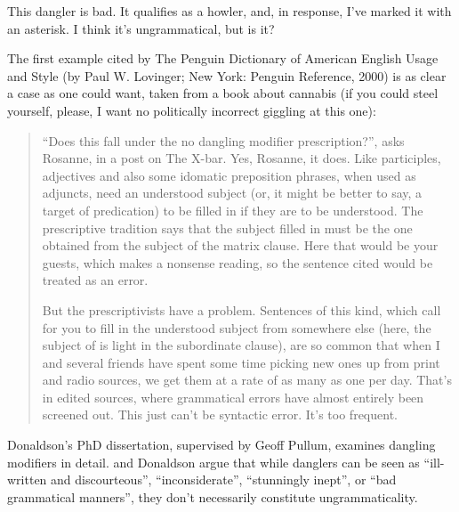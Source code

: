 This dangler is bad. It qualifies as a howler, and, in response, I've marked it with an asterisk. I think it's ungrammatical, but is it?

The first example cited by The Penguin Dictionary of American English Usage and Style (by Paul W. Lovinger; New York: Penguin Reference, 2000) is as clear a case as one could want, taken from a book about cannabis (if you could steel yourself, please, I want no politically incorrect giggling at this one):

\ea
 \z
\z

\begin{quote}
\enquote{Does this fall under the no dangling modifier prescription?}, asks Rosanne, in a post on The X-bar. Yes, Rosanne, it does. Like participles, adjectives and also some idomatic preposition phrases, when used as adjuncts, need an understood subject (or, it might be better to say, a target of predication) to be filled in if they are to be understood. The prescriptive tradition says that the subject filled in must be the one obtained from the subject of the matrix clause. Here that would be your guests, which makes a nonsense reading, so the sentence cited would be treated as an error.

But the prescriptivists have a problem. Sentences of this kind, which call for you to fill in the understood subject from somewhere else (here, the subject of is light in the subordinate clause), are so common that when I and several friends have spent some time picking new ones up from print and radio sources, we get them at a rate of as many as one per day. That's in edited sources, where grammatical errors have almost entirely been screened out. This just can't be syntactic error. It's too frequent.\hfill\citep{LanguageLog218}
\end{quote}

Donaldson's PhD dissertation, supervised by Geoff Pullum, examines dangling modifiers in detail. \citet{LanguageLog218,LanguageLog1938,LanguageLog1973,LanguageLog2153} and Donaldson argue that while danglers can be seen as \enquote{ill-written and discourteous}, \enquote{inconsiderate}, \enquote{stunningly inept}, or \enquote{bad grammatical manners}, they don't necessarily constitute ungrammaticality.


